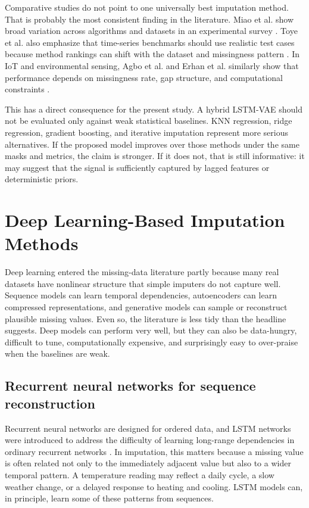 Comparative studies do not point to one universally best imputation method. That is probably the most consistent finding in the literature. Miao et al. show broad variation across algorithms and datasets in an experimental survey \cite{Miao2023AnES}. Toye et al. also emphasize that time-series benchmarks should use realistic test cases because method rankings can shift with the dataset and missingness pattern \cite{Toye2025BenchmarkingMD}. In IoT and environmental sensing, Agbo et al. and Erhan et al. similarly show that performance depends on missingness rate, gap structure, and computational constraints \cite{Agbo2022MissingDI,Erhan2021CriticalCO}.

This has a direct consequence for the present study. A hybrid LSTM-VAE should not be evaluated only against weak statistical baselines. KNN regression, ridge regression, gradient boosting, and iterative imputation represent more serious alternatives. If the proposed model improves over those methods under the same masks and metrics, the claim is stronger. If it does not, that is still informative: it may suggest that the signal is sufficiently captured by lagged features or deterministic priors.

\section{Deep Learning-Based Imputation Methods}

Deep learning entered the missing-data literature partly because many real datasets have nonlinear structure that simple imputers do not capture well. Sequence models can learn temporal dependencies, autoencoders can learn compressed representations, and generative models can sample or reconstruct plausible missing values. Even so, the literature is less tidy than the headline suggests. Deep models can perform very well, but they can also be data-hungry, difficult to tune, computationally expensive, and surprisingly easy to over-praise when the baselines are weak.

\subsection{Recurrent neural networks for sequence reconstruction}

Recurrent neural networks are designed for ordered data, and LSTM networks were introduced to address the difficulty of learning long-range dependencies in ordinary recurrent networks \cite{Hochreiter1997}. In imputation, this matters because a missing value is often related not only to the immediately adjacent value but also to a wider temporal pattern. A temperature reading may reflect a daily cycle, a slow weather change, or a delayed response to heating and cooling. LSTM models can, in principle, learn some of these patterns from sequences.

